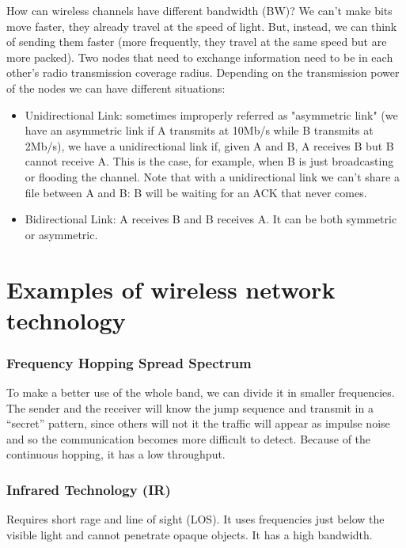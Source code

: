 How can wireless channels have different bandwidth (BW)? We can't make 
bits move faster, they already travel at the speed of light. But, instead, we 
can think of sending them faster (more frequently, they travel at the same 
speed but are more packed).
Two nodes that need to exchange information need to be in each other's 
radio transmission coverage radius. Depending on the transmission power of the 
nodes we can have different situations:
\begin{itemize}
\item Unidirectional Link: sometimes improperly referred as 
  "asymmetric link" (we have an asymmetric link if A transmits at 10Mb/s while B 
  transmits at 2Mb/s), we have a unidirectional link if, given A and B, A
  receives B but B cannot receive A. This is the case, for example, when B is
  just broadcasting or flooding the channel. Note that with a unidirectional
  link we can't share a file between A and B: B will be waiting for an ACK that
  never comes.
\item Bidirectional Link: A receives B and B receives A. It can be both
  symmetric or asymmetric.
\end{itemize}

\section{Examples of wireless network technology}

\subsubsection{Frequency Hopping Spread Spectrum}
To make a better use of the whole band, we can divide it in smaller frequencies.
The sender and the receiver will know the jump sequence and transmit in a
``secret'' pattern, since others will not it the traffic will appear as impulse
noise and so the communication becomes more difficult to detect. Because of the
continuous hopping, it has a low throughput.

\subsubsection{Infrared Technology (IR)}
Requires short rage and line of 
sight (LOS). It uses frequencies just below the visible light and cannot 
penetrate opaque objects. It has a high bandwidth.

